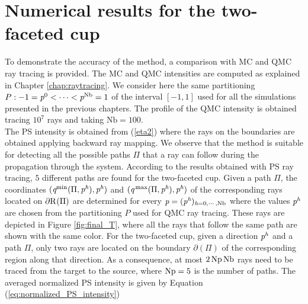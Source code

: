 \section{Numerical results for the two-faceted cup}
To demonstrate the accuracy of the method, a comparison with MC and QMC ray tracing is provided.
The MC and QMC intensities are computed as explained in Chapter \ref{chap:raytracing}. 
We consider here the same partitioning $P:-1 = \textit{p}^0 < \cdots< \textit{p}^\textrm{Nb} = 1$ of the interval $[-1,1]$ used for all the simulations presented in the previous chapters. 
The profile of the QMC intensity is obtained tracing $10^7$ rays and taking $\textrm{Nb} = 100$.%
\\ \indent  The PS intensity is obtained from (\ref{eta2}) where the rays on the boundaries are obtained applying backward ray mapping. We observe that the method is suitable for detecting all the possible paths $\Pi$ that a ray can follow during the propagation through the system. According to the results obtained with PS ray tracing, $5$ different paths are found for the two-faceted cup. Given a path $\Pi$, the coordinates $(\textit{q}^\textrm{min}(\Pi, \textit{p}^ {\textit{h}}), \textit{p}^ {\textit{h}})$ and $(\textit{q}^\textrm{\,max}(\Pi, \textit{p}^ {\textit{h}}), \textit{p}^{\textit{h}})$ of the corresponding rays located on $\partial \mbox{$\textup{R}_{\textit{}}$}(\Pi)$ are determined for every $\textit{p} = (\textit{p}^{\textit{h}})_{\textit{h}=0, \cdots, \textrm{Nb}}$ where the values $\textit{p}^{\textit{h}}$ are chosen from the partitioning $P$ used for QMC ray tracing. These rays are depicted in Figure \ref{fig:final_T}, where all the rays that follow the same path are shown with the same color. For the two-faceted cup, given a direction $\textit{p}^{\textit{h}}$ and a path $\Pi$, only two rays are located on the boundary $\partial$$(\Pi)$ of the corresponding region along that direction. As a consequence, at most $2\,\textrm{Np}\,\textrm{Nb}$ rays need to be traced from the target to the source, where $\textrm{Np} =5$ is the number of paths.
The averaged normalized PS intensity is given by Equation (\ref{eq:normalized_PS_intensity})
